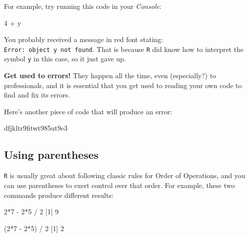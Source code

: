 \documentclass[
]{book}
\newenvironment{Shaded}{\begin{snugshade}}{\end{snugshade}}
\newcommand{\DecValTok}[1]{\textcolor[rgb]{0.00,0.00,0.81}{#1}}
\newcommand{\NormalTok}[1]{#1}
\newcommand{\SpecialCharTok}[1]{\textcolor[rgb]{0.00,0.00,0.00}{#1}}
\begin{document}
For example, try running this code in your \emph{Console}:

\begin{Shaded}
\begin{Highlighting}[]
\DecValTok{4} \SpecialCharTok{+}\NormalTok{ y}
\end{Highlighting}
\end{Shaded}

You probably received a message in red font stating: \texttt{Error:\ object\ \textquotesingle{}y\textquotesingle{}\ not\ found}. That is because \texttt{R} did know how to interpret the symbol \texttt{y} in this case, so it just gave up.

\textbf{Get used to errors!} They happen all the time, even (especially?) to professionals, and it is essential that you get used to reading your own code to find and fix its errors.

Here's another piece of code that will produce an error:

\begin{Shaded}
\begin{Highlighting}[]
\NormalTok{dfjkltr9fitwt985ut9e3}
\end{Highlighting}
\end{Shaded}

\hypertarget{using-parentheses}{%
\subsection*{Using parentheses}\label{using-parentheses}}

\texttt{R} is usually great about following classic rules for Order of Operations, and you can use parentheses to exert control over that order. For example, these two commands produce different results:

\begin{Shaded}
\begin{Highlighting}[]
\DecValTok{2}\SpecialCharTok{*}\DecValTok{7} \SpecialCharTok{{-}} \DecValTok{2}\SpecialCharTok{*}\DecValTok{5} \SpecialCharTok{/} \DecValTok{2}
\NormalTok{[}\DecValTok{1}\NormalTok{] }\DecValTok{9}
\end{Highlighting}
\end{Shaded}

\begin{Shaded}
\begin{Highlighting}[]
\NormalTok{(}\DecValTok{2}\SpecialCharTok{*}\DecValTok{7} \SpecialCharTok{{-}} \DecValTok{2}\SpecialCharTok{*}\DecValTok{5}\NormalTok{) }\SpecialCharTok{/} \DecValTok{2}
\NormalTok{[}\DecValTok{1}\NormalTok{] }\DecValTok{2}
\end{Highlighting}
\end{Shaded}
\end{document}
